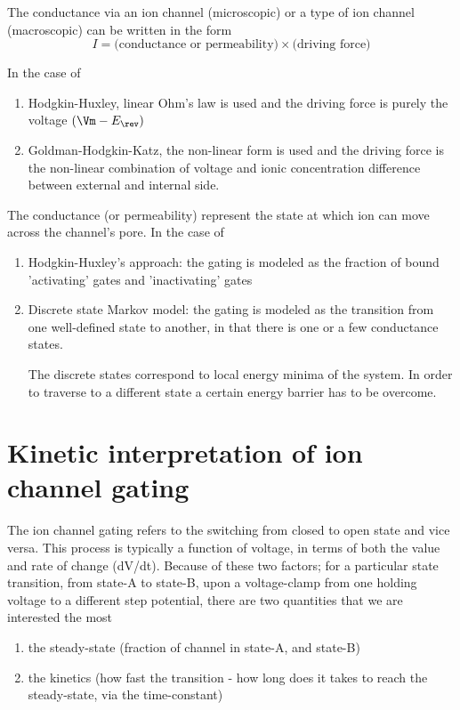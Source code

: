 
The conductance via an ion channel (microscopic) or a type of ion channel
(macroscopic) can be written in the form
\begin{equation}
I = \text{(conductance or permeability)} \times \text{(driving force)}
\end{equation}

In the case of
\begin{enumerate}
  \item  Hodgkin-Huxley, linear Ohm's law is used and the driving force is
purely the voltage $(\Vm - E_\rev)$

  \item Goldman-Hodgkin-Katz, the non-linear form is used and the driving force
  is the non-linear combination of voltage and ionic concentration difference
  between external and internal side.
\end{enumerate}

The conductance (or permeability) represent the state at which
ion can move across the channel's pore. In the case of
\begin{enumerate}
  \item Hodgkin-Huxley's approach: the gating is modeled as the fraction of
  bound 'activating' gates and 'inactivating' gates

  \item Discrete state Markov model: the gating is modeled as the transition
  from one well-defined state to another, in that there is one or a few
  conductance states.

  The discrete states correspond to local energy minima of the system.
  In order to traverse to a different state a certain energy barrier has to be
  overcome.

\end{enumerate}

\section{Kinetic interpretation of ion channel gating}
\label{sec:kinet-interpr-ionic}

The ion channel gating refers to the switching from closed to open state and
vice versa. This process is typically a function of voltage, in terms of both
the value and rate of change (dV/dt). Because of these two factors; for a
particular state transition, from state-A to state-B, upon a voltage-clamp from
one holding voltage to a different step potential, there are two quantities that
we are interested the most
\begin{enumerate}
  \item the steady-state (fraction of channel in state-A, and state-B)
  \item the kinetics (how fast the transition - how long does it takes to reach
  the steady-state, via the time-constant)
\end{enumerate}

